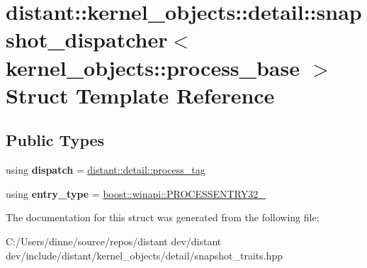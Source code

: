 \hypertarget{structdistant_1_1kernel__objects_1_1detail_1_1snapshot__dispatcher_3_01kernel__objects_1_1process__base_01_4}{}\section{distant\+:\+:kernel\+\_\+objects\+:\+:detail\+:\+:snapshot\+\_\+dispatcher$<$ kernel\+\_\+objects\+:\+:process\+\_\+base $>$ Struct Template Reference}
\label{structdistant_1_1kernel__objects_1_1detail_1_1snapshot__dispatcher_3_01kernel__objects_1_1process__base_01_4}
\subsection*{Public Types}
\begin{DoxyCompactItemize}
\item 
\mbox{\label{structdistant_1_1kernel__objects_1_1detail_1_1snapshot__dispatcher_3_01kernel__objects_1_1process__base_01_4_acf87f4f154385f3781a1374b9618535f}} 
using {\bfseries dispatch} = \mbox{\hyperlink{classdistant_1_1detail_1_1process__tag}{distant\+::detail\+::process\+\_\+tag}}
\item 
\mbox{\label{structdistant_1_1kernel__objects_1_1detail_1_1snapshot__dispatcher_3_01kernel__objects_1_1process__base_01_4_a8bbf162cfc2b881188438a8f433e8296}} 
using {\bfseries entry\+\_\+type} = \mbox{\hyperlink{structboost_1_1winapi_1_1tag_p_r_o_c_e_s_s_e_n_t_r_y32__}{boost\+::winapi\+::\+P\+R\+O\+C\+E\+S\+S\+E\+N\+T\+R\+Y32\+\_\+}}
\end{DoxyCompactItemize}


The documentation for this struct was generated from the following file\+:\begin{DoxyCompactItemize}
\item 
C\+:/\+Users/dinne/source/repos/distant dev/distant dev/include/distant/kernel\+\_\+objects/detail/snapshot\+\_\+traits.\+hpp\end{DoxyCompactItemize}

